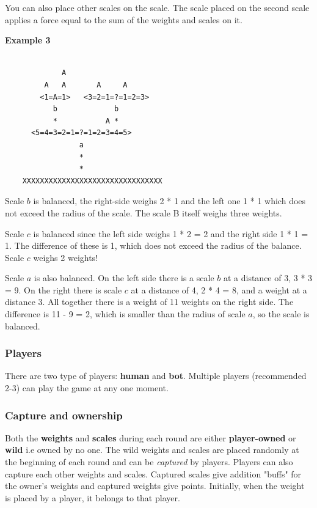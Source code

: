 \documentclass[12pt]{article}
\begin{document}
You can also place other scales on the scale. The scale placed on the second
scale applies a force equal to the sum of the weights and scales on it.

\textbf{Example 3}

\begin{verbatim}

             A
         A   A       A     A
        <1=A=1>   <3=2=1=?=1=2=3>
           b             b
           *           A *
      <5=4=3=2=1=?=1=2=3=4=5>
                 a
                 *
                 *
    XXXXXXXXXXXXXXXXXXXXXXXXXXXXXXXX
\end{verbatim}

Scale $b$ is balanced, the right-side weighs 2 * 1 and the left one 1 * 1 which
does not exceed the radius of the scale. The scale B itself weighs three
weights.

Scale $c$ is balanced since the left side weighs 1 * 2 = 2 and the right side 1
* 1 = 1. The difference of these is 1, which does not exceed the radius of the
balance. Scale $c$ weighs 2 weights!

Scale $a$ is also balanced. On the left side there is a scale $b$ at a distance
of 3, 3 * 3 = 9. On the right there is scale $c$ at a distance of 4, 2 * 4 = 8,
and a weight at a distance 3. All together there is a weight of 11 weights on
the right side. The difference is 11 - 9 = 2, which is smaller than the radius
of scale $a$, so the scale is balanced.

\subsubsection{Players}
There are two type of players: \textbf{human} and \textbf{bot}. Multiple players
(recommended 2-3) can play the game at any one moment.
\subsubsection{Capture and ownership}
\label{sec:cap}

Both the \textbf{weights} and \textbf{scales} during each round are either
\textbf{player-owned} or \textbf{wild} i.e owned by no one. The wild weights and
scales are placed randomly at the beginning of each round and can be
\textit{captured} by players. Players can also capture each other weights and
scales. Captured scales give addition "buffs" for the owner's weights and
captured weights give points. Initially, when the weight is placed by a player,
it belongs to that player.
\end{document}
